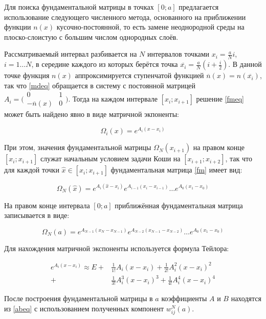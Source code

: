 \documentclass{article}
\numberwithin{equation}{section}
\begin{document}
Для поиска фундаментальной матрицы в точках $[0; a]$ предлагается
использование следующего численного метода, основанного на приближении
функции $n(x)$ кусочно-постоянной, то есть замене неоднородной среды
на плоско-слоистую с большим числом однородных слоёв.

Рассматриваемый интервал разбивается на $N$ интервалов точками
$x_i = \frac{a}{N}i$, $i = 1 \ldots N$, в середине каждого из
которых берётся точка $\overline{x_i} = \frac{a}{N}(i+\frac{i}{2})$. В
данной точке функция $n(x)$ аппроксимируется ступенчатой функцией
$\overline{n}(x) = n(\overline{x_i})$, так что \eqref{mdeq} обращается
в систему с постоянной матрицей $A_i = \bigl(
\begin{smallmatrix}0& 1 \\ -\overline{n}(x)& 0 \end{smallmatrix}
\bigr)$. Тогда на каждом интервале $[x_i; x_{i+1}]$ решение
\eqref{fmeq} может быть найдено явно в виде матричной экпоненты:

\[
\Omega_i(x) = e^{A_i (x - x_i)}
\]

При этом, значения фундаментальной матрицы $\Omega_N(x_{i+1})$ на
правом конце $[x_i; x_{i+1}]$ служат начальным условием задачи Коши на
$[x_{i+1}; x_{i+2}]$, так что для каждой точки $\hat{x} \in [x_i;
x_{i+1}]$ фундаментальная матрица \eqref{fm} имеет вид:

\[
\Omega_N(\hat{x}) = e^{A_i(\hat{x}-x_i)} e^{A_{i-1}(x_i-x_{i-1})} \ldots e^{A_0(x_1-x_0)}
\]

На правом конце интервала $[0; a]$ приближённая фундаментальная
матрица записывается в виде:

\begin{equation}\label{fma}
  \Omega_N(a) = e^{A_{N-1}(x_N-x_{N-1})} e^{A_{N-2}(x_{N-1}-x_{N-2})} \ldots e^{A_0(x_1-x_0)}
\end{equation}

Для нахождения матричной экспоненты используется формула Тейлора:

\begin{equation}
\begin{split}
  e^{A_i(x-x_i)} \approx E +& \frac{1}{1!}{A_i(x-x_i)} +
  \frac{1}{2!}{A_i^2(x-x_i)^2}\\
  +& \frac{1}{3!}{A_i^3(x-x_i)^3} + \frac{1}{4!}{A_i^4(x-x_i)^4}
\end{split}
\end{equation}

После построения фундаментальной матрицы в $a$ коэффициенты $A$ и $B$
находятся из \eqref{abeq} с использованием полученных компонент
$w_{ij}^N(a)$.
\end{document}

